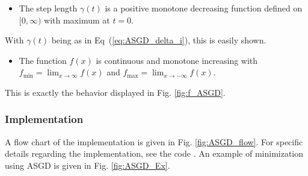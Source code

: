\begin{itemize}
 \item The step length $\gamma(t)$ is a positive monotone decreasing function defined on $[0,\infty)$ with maximum at $t=0$.
\end{itemize}

With $\gamma(t)$ being as in Eq~(\ref{eq:ASGD_delta_i}), this is easily shown.

\begin{itemize}
 \item The function $f(x)$ is continuous and monotone increasing with $f_\mathrm{min} = \displaystyle\lim_{x\to\infty} f(x)$ and $f_\mathrm{max} =  \displaystyle\lim_{x\to-\infty} f(x)$.
\end{itemize}

This is exactly the behavior displayed in Fig. \ref{fig:f_ASGD}.

\subsubsection{Implementation}

A flow chart of the implementation is given in Fig. \ref{fig:ASGD_flow}. For specific details regarding the implementation, see the code \cite{libBorealisCode}. An example of minimization using ASGD is given in Fig. \ref{fig:ASGD_Ex}. 

